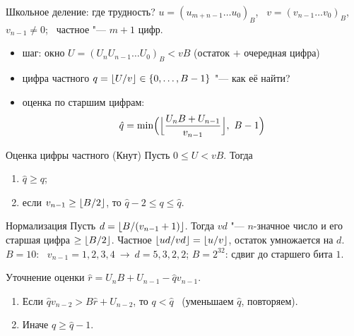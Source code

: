 \documentclass{ca-slides}
\begin{document}
\begin{canvasframe}{Школьное деление: где трудность?}
  $u = (u_{m+n-1} \dots u_0)_B$, \ $v = (v_{n-1} \dots v_0)_B$, $v_{n-1} \ne 0$; \ частное "---
  $m + 1$ цифр.
  \begin{itemize}
    \item шаг: окно $U = (U_n U_{n-1} \dots U_0)_B < vB$ (остаток $+$ очередная цифра)
    \item цифра частного $q = \lfloor U/v\rfloor \in \{0, \dots, B - 1\}$ "--- \alert{как её найти?}
    \item оценка по старшим цифрам:
      \[\hat q = \min\Bigl(\Bigl\lfloor \frac{U_n B + U_{n-1}}{v_{n-1}} \Bigr\rfloor,\ B - 1\Bigr)\]
  \end{itemize}
\end{canvasframe}

\begin{theoremframe}{Оценка цифры частного (Кнут)}
  Пусть $0 \le U < vB$. Тогда
  \begin{enumerate}
    \item $\hat q \ge q$;
    \item если $v_{n-1} \ge \lfloor B/2\rfloor$, то $\hat q - 2 \le q \le \hat q$.
  \end{enumerate}
\end{theoremframe}

\begin{theoremframe}[lemma]{Нормализация}
  Пусть $d = \lfloor B / (v_{n-1} + 1)\rfloor$. Тогда $vd$ "--- $n$-значное число и его старшая цифра
  $\ge \lfloor B/2\rfloor$. Частное $\lfloor ud / vd\rfloor = \lfloor u/v\rfloor$, остаток умножается на $d$.\\[1ex]
  \small $B = 10$: \ $v_{n-1} = 1, 2, 3, 4 \ \to\ d = 5, 3, 2, 2$; \quad $B = 2^{32}$: сдвиг до
  старшего бита $1$.
\end{theoremframe}

\begin{theoremframe}[lemma]{Уточнение оценки}
  $\hat r = U_n B + U_{n-1} - \hat q v_{n-1}$.
  \begin{enumerate}
    \item Если $\hat q v_{n-2} > B\hat r + U_{n-2}$, то $q < \hat q$ \ (уменьшаем $\hat q$, повторяем).
    \item Иначе $q \ge \hat q - 1$.
  \end{enumerate}
\end{theoremframe}
\end{document}
